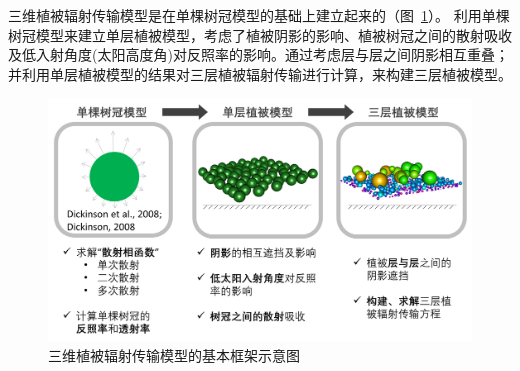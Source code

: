 三维植被辐射传输模型\citep{yuan20143d}是在单棵树冠模型\citep{dickinson2008determination,dickinson2008three}的基础上建立起来的（图~\ref{fig:三维植被辐射传输模型的基本框架}）。
利用单棵树冠模型来建立单层植被模型，考虑了植被阴影的影响、植被树冠之间的散射吸收及低入射角度(太阳高度角)对反照率的影响。通过考虑层与层之间阴影相互重叠；
并利用单层植被模型的结果对三层植被辐射传输进行计算，来构建三层植被模型。
{
\begin{figure}[]
\centering
\includegraphics[width=0.95\columnwidth]{Figures/辐射过程及辐射通量计算/三维植被辐射传输模型基本框架.png}
\caption{三维植被辐射传输模型的基本框架示意图}
\label{fig:三维植被辐射传输模型的基本框架}
\end{figure}
}


